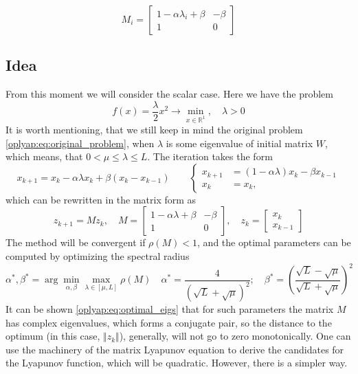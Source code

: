 \documentclass[a4paper,11pt]{article}
\begin{document}
\begin{equation}
 M_i = \begin{bmatrix} 
 1 - \alpha \lambda_i + \beta & -\beta \\
 1 & 0
 \end{bmatrix}
 \label{oplyap:eq:m_i}
\end{equation}
\subsection{Idea}
From this moment we will consider the scalar case. Here we have the problem
\begin{equation}
 f(x) = \frac\lambda2 x^2 \to \min_{x \in \mathbb{R}^1}, \quad \lambda >0
\end{equation}
It is worth mentioning, that we still keep in mind the original problem \eqref{oplyap:eq:original_problem}, when $\lambda$ is some eigenvalue of initial matrix $W$, which means, that $0 < \mu \leq \lambda \leq L$. The iteration takes the form
\begin{equation}
 x_{k+1} = x_k - \alpha \lambda x_k + \beta(x_k - x_{k-1})
 \qquad
 \begin{cases}
 x_{k+1} &= (1 - \alpha \lambda) x_k - \beta x_{k-1} \\
 x_{k} &=x_k ,
 \end{cases}
 \end{equation}
which can be rewritten in the matrix form as
\begin{equation}
 \label{oplyap:scalar_problem}
 z_{k+1} = M z_k, \quad M = \begin{bmatrix} 
 1 - \alpha \lambda + \beta & -\beta \\
 1 & 0
 \end{bmatrix},\quad
 z_k = \begin{bmatrix} 
 x_{k} \\
 x_{k-1}
 \end{bmatrix}
\end{equation}
The method will be convergent if $\rho(M) < 1$, and the optimal parameters can be computed by optimizing the spectral radius \cite{polyak1964some}
\begin{equation}
 \label{oplyap:eq:optimal_hyperpars}
 \alpha^*, \beta^* = \arg \min_{\alpha, \beta} \max_{\lambda \in [\mu, L]} \rho(M) \quad \alpha^* = \dfrac{4}{(\sqrt{L} + \sqrt{\mu})^2}; \quad \beta^* = \left(\dfrac{\sqrt{L} - \sqrt{\mu}}{\sqrt{L} + \sqrt{\mu}}\right)^2
\end{equation}
It can be shown \eqref{oplyap:eq:optimal_eigs} that for such parameters the matrix $M$ has complex eigenvalues, which forms a conjugate pair, so the distance to the optimum (in this case, $\Vert z_k \Vert$), generally, will not go to zero monotonically. 
One can use the machinery of the matrix Lyapunov equation \cite{hammarling1982numerical} to derive the candidates for the Lyapunov function, which will be quadratic. However, there is a simpler way. 
\end{document}
